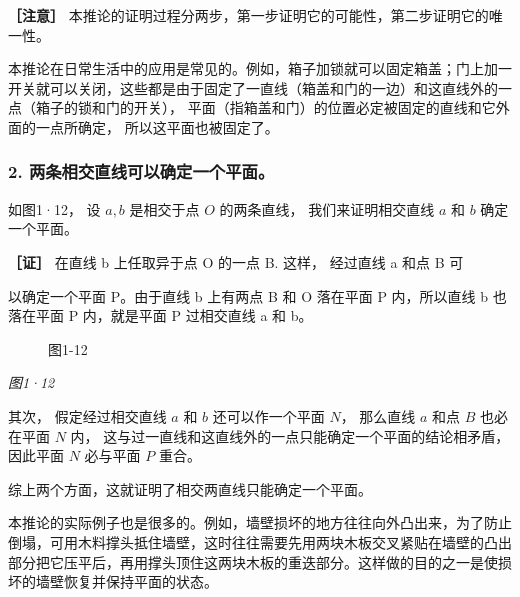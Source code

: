 \textbf{［注意］}
本推论的证明过程分两步，第一步证明它的可能性，第二步证明它的唯一性。

本推论在日常生活中的应用是常见的。例如，箱子加锁就可以固定箱盖；门上加一开关就可以关闭，这些都是由于固定了一直线（箱盖和门的一边）和这直线外的一点（箱子的锁和门的开关），
平面（指箱盖和门）的位置必定被固定的直线和它外面的一点所确定，
所以这平面也被固定了。

\subsubsection{2.
两条相交直线可以确定一个平面。}

如图1·12， 设 \(a, b\) 是相交于点 \(O\) 的两条直线， 我们来证明相交直线
\(a\) 和 \(b\) 确定一个平面。

\textbf{［证］} 在直线 b 上任取异于点 O 的一点 B. 这样， 经过直线 a 和点
B 可

以确定一个平面 P。由于直线 b 上有两点 B 和 O 落在平面 P 内，所以直线 b
也落在平面 P 内，就是平面 P 过相交直线 a 和 b。

\begin{figure}
\centering
{}
\caption{图1-12}
\end{figure}

\emph{图1·12}

其次， 假定经过相交直线 \(a\) 和 \(b\) 还可以作一个平面 \(N\)， 那么直线
\(a\) 和点 \(B\) 也必在平面 \(N\) 内，
这与过一直线和这直线外的一点只能确定一个平面的结论相矛盾， 因此平面
\(N\) 必与平面 \(P\) 重合。

综上两个方面，这就证明了相交两直线只能确定一个平面。

本推论的实际例子也是很多的。例如，墙壁损坏的地方往往向外凸出来，为了防止倒塌，可用木料撑头抵住墙壁，这时往往需要先用两块木板交叉紧贴在墙壁的凸出部分把它压平后，再用撑头顶住这两块木板的重迭部分。这样做的目的之一是使损坏的墙壁恢复并保持平面的状态。

